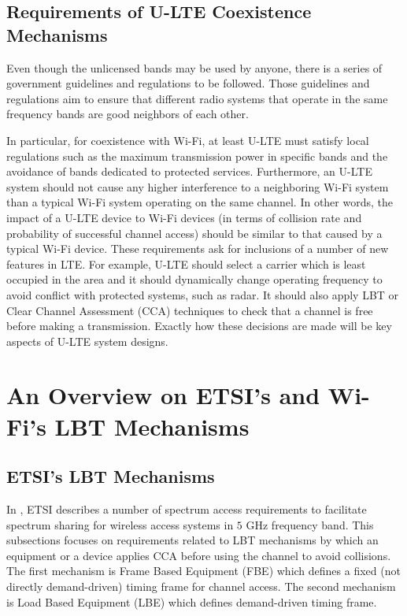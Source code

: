 \documentclass[12pt,onecolumn]{article}
\begin{document}
\subsection{Requirements of U-LTE Coexistence Mechanisms}

\noindent Even though the unlicensed bands may be used by anyone, there is a series of government guidelines and regulations to be followed. Those guidelines and regulations aim to ensure that different radio systems that operate in the same frequency bands are good neighbors of each other.

In particular, for coexistence with Wi-Fi, at least U-LTE must satisfy local regulations such as the maximum transmission power in specific bands and the avoidance of bands dedicated to protected services. Furthermore, an U-LTE system should not cause any higher interference to a neighboring Wi-Fi system than a typical Wi-Fi system operating on the same channel. In other words, the impact of a U-LTE device to Wi-Fi devices (in terms of collision rate and probability of successful channel access) should be similar to that caused by a typical Wi-Fi device. These requirements ask for inclusions of a number of new features in LTE. For example, U-LTE should select a carrier which is least occupied in the area and it should dynamically change operating frequency to avoid conflict with protected systems, such as radar. It should also apply LBT or Clear Channel Assessment (CCA) techniques to check that a channel is free before making a transmission. Exactly how these decisions are made will be key aspects of U-LTE system designs.

\section{An Overview on ETSI's and Wi-Fi's LBT Mechanisms}
\label{sec:LBT-overview}

\subsection{ETSI's LBT Mechanisms}
\label{subsec:ETSI-LBT-overview}

In \cite{LBT-ETSI-2014}, ETSI describes a number of spectrum access requirements to facilitate spectrum sharing for wireless access systems in $5$ GHz frequency band. This subsections focuses on requirements related to LBT mechanisms by which an equipment or a device applies CCA before using the channel to avoid collisions. The first mechanism is Frame Based Equipment (FBE) which defines a fixed (not directly demand-driven) timing frame for channel access. The second mechanism is Load Based Equipment (LBE) which defines demand-driven timing frame.
\end{document}
